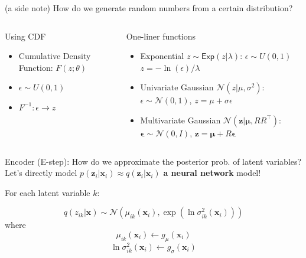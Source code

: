 \documentclass[
  ignorenonframetext,
  aspectratio=169]{beamer}
\begin{document}
\begin{frame}{(a side note) How do we generate random numbers from a
certain distribution?}
\protect\hypertarget{a-side-note-how-do-we-generate-random-numbers-from-a-certain-distribution}{}
\begin{columns}[T]
\begin{column}{.5\textwidth}
\begin{block}{Using CDF}
\protect\hypertarget{using-cdf}{}
\begin{itemize}
\item
  Cumulative Density Function: \(F(z; \theta)\)
\item
  \(\epsilon \sim U(0, 1)\)
\item
  \(F^{-1}: \epsilon \to z\)
\end{itemize}
\end{block}
\end{column}

\begin{column}{.5\textwidth}
\begin{block}{One-liner functions}
\protect\hypertarget{one-liner-functions}{}
\begin{itemize}
\item
  Exponential \(z \sim \mathsf{Exp}(z|\lambda)\):
  \(\epsilon \sim U(0, 1)\) \(z = - \ln (\epsilon) / \lambda\)
\item
  Univariate Gaussian \(\mathcal{N}\!\left(z|\mu,\sigma^{2}\right)\):
  \(\epsilon \sim \mathcal{N}\!\left(0,1\right)\),
  \(z = \mu + \sigma \epsilon\)
\item
  Multivariate Gaussian
  \(\mathcal{N}\!\left(\mathbf{z}|\boldsymbol{\mu}, RR^{\top}\right)\):
  \(\boldsymbol{\epsilon} \sim \mathcal{N}\!\left(0, I\right)\),
  \(\mathbf{z} = \boldsymbol{\mu} + R \boldsymbol{\epsilon}\)
\end{itemize}
\end{block}
\end{column}
\end{columns}

\scriptsize

\normalsize
\end{frame}

\begin{frame}{Encoder (E-step): How do we approximate the posterior
prob. of latent variables?}
\protect\hypertarget{encoder-e-step-how-do-we-approximate-the-posterior-prob.-of-latent-variables}{}
Let's directly model
\(p(\mathbf{z}_{i}|\mathbf{x}_{i}) \approx q(\mathbf{z}_{i}|\mathbf{x}_{i})\)
\textbf{a neural network} model!

For each latent variable \(k\):

\[q(z_{ik}|\mathbf{x}) \sim \mathcal{N}\!\left(\mu_{ik}(\mathbf{x}_{i}), \exp(\ln\sigma_{ik}^{2}(\mathbf{x}_{i})) \right)\]
where \[\mu_{ik}(\mathbf{x}_{i}) \gets g_{\mu}(\mathbf{x}_{i})\]
\[\ln\sigma^{2}_{ik}(\mathbf{x}_{i}) \gets g_{\sigma}(\mathbf{x}_{i})\]

\scriptsize

\normalsize
\end{frame}
\end{document}
